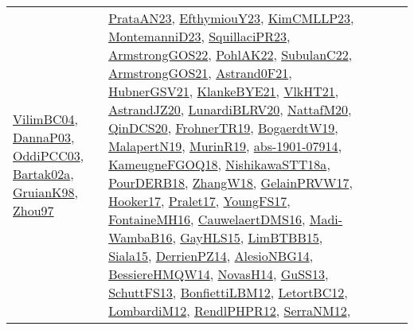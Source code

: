 {\begin{longtable}{lp{3cm}>{\raggedright}p{6cm}>{\raggedright}p{6cm}p{8cm}}
\href{papers/VilimBC04.pdf}{VilimBC04}\cite{VilimBC04}, \href{papers/DannaP03.pdf}{DannaP03}\cite{DannaP03}, \href{papers/OddiPCC03.pdf}{OddiPCC03}\cite{OddiPCC03}, \href{papers/Bartak02a.pdf}{Bartak02a}\cite{Bartak02a}, \href{papers/GruianK98.pdf}{GruianK98}\cite{GruianK98}, \href{articles/Zhou97.pdf}{Zhou97}\cite{Zhou97} & \href{articles/PrataAN23.pdf}{PrataAN23}\cite{PrataAN23}, \href{papers/EfthymiouY23.pdf}{EfthymiouY23}\cite{EfthymiouY23}, \href{papers/KimCMLLP23.pdf}{KimCMLLP23}\cite{KimCMLLP23}, \href{articles/MontemanniD23.pdf}{MontemanniD23}\cite{MontemanniD23}, \href{papers/SquillaciPR23.pdf}{SquillaciPR23}\cite{SquillaciPR23}, \href{papers/ArmstrongGOS22.pdf}{ArmstrongGOS22}\cite{ArmstrongGOS22}, \href{articles/PohlAK22.pdf}{PohlAK22}\cite{PohlAK22}, \href{articles/SubulanC22.pdf}{SubulanC22}\cite{SubulanC22}, \href{papers/ArmstrongGOS21.pdf}{ArmstrongGOS21}\cite{ArmstrongGOS21}, \href{papers/Astrand0F21.pdf}{Astrand0F21}\cite{Astrand0F21}, \href{articles/HubnerGSV21.pdf}{HubnerGSV21}\cite{HubnerGSV21}, \href{papers/KlankeBYE21.pdf}{KlankeBYE21}\cite{KlankeBYE21}, \href{articles/VlkHT21.pdf}{VlkHT21}\cite{VlkHT21}, \href{articles/AstrandJZ20.pdf}{AstrandJZ20}\cite{AstrandJZ20}, \href{articles/LunardiBLRV20.pdf}{LunardiBLRV20}\cite{LunardiBLRV20}, \href{papers/NattafM20.pdf}{NattafM20}\cite{NattafM20}, \href{articles/QinDCS20.pdf}{QinDCS20}\cite{QinDCS20}, \href{papers/FrohnerTR19.pdf}{FrohnerTR19}\cite{FrohnerTR19}, \href{papers/BogaerdtW19.pdf}{BogaerdtW19}\cite{BogaerdtW19}, \href{papers/MalapertN19.pdf}{MalapertN19}\cite{MalapertN19}, \href{papers/MurinR19.pdf}{MurinR19}\cite{MurinR19}, \href{articles/abs-1901-07914.pdf}{abs-1901-07914}\cite{abs-1901-07914}, \href{papers/KameugneFGOQ18.pdf}{KameugneFGOQ18}\cite{KameugneFGOQ18}, \href{papers/NishikawaSTT18a.pdf}{NishikawaSTT18a}\cite{NishikawaSTT18a}, \href{articles/PourDERB18.pdf}{PourDERB18}\cite{PourDERB18}, \href{articles/ZhangW18.pdf}{ZhangW18}\cite{ZhangW18}, \href{papers/GelainPRVW17.pdf}{GelainPRVW17}\cite{GelainPRVW17}, \href{papers/Hooker17.pdf}{Hooker17}\cite{Hooker17}, \href{papers/Pralet17.pdf}{Pralet17}\cite{Pralet17}, \href{papers/YoungFS17.pdf}{YoungFS17}\cite{YoungFS17}, \href{papers/FontaineMH16.pdf}{FontaineMH16}\cite{FontaineMH16}, \href{papers/CauwelaertDMS16.pdf}{CauwelaertDMS16}\cite{CauwelaertDMS16}, \href{papers/Madi-WambaB16.pdf}{Madi-WambaB16}\cite{Madi-WambaB16}, \href{papers/GayHLS15.pdf}{GayHLS15}\cite{GayHLS15}, \href{papers/LimBTBB15.pdf}{LimBTBB15}\cite{LimBTBB15}, \href{articles/Siala15.pdf}{Siala15}\cite{Siala15}, \href{papers/DerrienPZ14.pdf}{DerrienPZ14}\cite{DerrienPZ14}, \href{papers/AlesioNBG14.pdf}{AlesioNBG14}\cite{AlesioNBG14}, \href{papers/BessiereHMQW14.pdf}{BessiereHMQW14}\cite{BessiereHMQW14}, \href{articles/NovasH14.pdf}{NovasH14}\cite{NovasH14}, \href{papers/GuSS13.pdf}{GuSS13}\cite{GuSS13}, \href{papers/SchuttFS13.pdf}{SchuttFS13}\cite{SchuttFS13}, \href{papers/BonfiettiLBM12.pdf}{BonfiettiLBM12}\cite{BonfiettiLBM12}, \href{papers/LetortBC12.pdf}{LetortBC12}\cite{LetortBC12}, \href{articles/LombardiM12.pdf}{LombardiM12}\cite{LombardiM12}, \href{papers/RendlPHPR12.pdf}{RendlPHPR12}\cite{RendlPHPR12}, \href{papers/SerraNM12.pdf}{SerraNM12}\cite{SerraNM12}, 
\end{longtable}}
